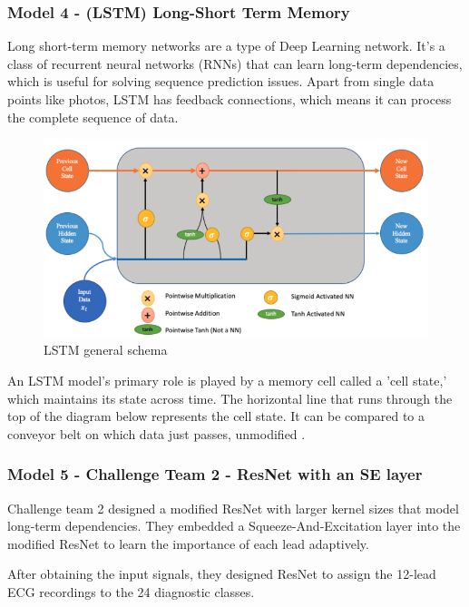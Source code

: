 \subsubsection{Model 4 - (LSTM) Long-Short Term Memory} \label{3model4}

Long short-term memory networks are a type of Deep Learning network. It's a class of recurrent neural networks (RNNs) that can learn long-term dependencies, which is useful for solving sequence prediction issues. Apart from single data points like photos, LSTM has feedback connections, which means it can process the complete sequence of data.

\begin{figure}[H]
\centering
\includegraphics[scale=0.5]{img/lstm.png}
\caption{LSTM general schema}
\label{fig:lstm}
\end{figure}

An LSTM model's primary role is played by a memory cell called a 'cell state,' which maintains its state across time. The horizontal line that runs through the top of the diagram below represents the cell state. It can be compared to a conveyor belt on which data just passes, unmodified \cite{lstm}.


\subsubsection{Model 5 - Challenge Team 2 - ResNet with an SE layer\cite{second_team} } \label{3model5}

Challenge team 2 designed a modified ResNet with larger kernel sizes that model long-term dependencies. They embedded a Squeeze-And-Excitation layer into the modified ResNet to learn the importance of each lead adaptively. 

After obtaining the input signals, they designed ResNet to assign the 12-lead ECG recordings to the 24 diagnostic classes. 

